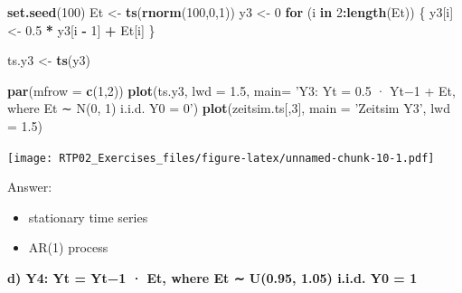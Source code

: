 \documentclass[
]{article}
\newenvironment{Shaded}{\begin{snugshade}}{\end{snugshade}}
\newcommand{\ControlFlowTok}[1]{\textcolor[rgb]{0.13,0.29,0.53}{\textbf{#1}}}
\newcommand{\DataTypeTok}[1]{\textcolor[rgb]{0.13,0.29,0.53}{#1}}
\newcommand{\DecValTok}[1]{\textcolor[rgb]{0.00,0.00,0.81}{#1}}
\newcommand{\FloatTok}[1]{\textcolor[rgb]{0.00,0.00,0.81}{#1}}
\newcommand{\KeywordTok}[1]{\textcolor[rgb]{0.13,0.29,0.53}{\textbf{#1}}}
\newcommand{\NormalTok}[1]{#1}
\newcommand{\OperatorTok}[1]{\textcolor[rgb]{0.81,0.36,0.00}{\textbf{#1}}}
\newcommand{\StringTok}[1]{\textcolor[rgb]{0.31,0.60,0.02}{#1}}
\begin{document}
\begin{Shaded}
\begin{Highlighting}[]
\KeywordTok{set.seed}\NormalTok{(}\DecValTok{100}\NormalTok{)}
\NormalTok{Et <-}\StringTok{ }\KeywordTok{ts}\NormalTok{(}\KeywordTok{rnorm}\NormalTok{(}\DecValTok{100}\NormalTok{,}\DecValTok{0}\NormalTok{,}\DecValTok{1}\NormalTok{))}
\NormalTok{y3 <-}\StringTok{ }\DecValTok{0}
\ControlFlowTok{for}\NormalTok{ (i }\ControlFlowTok{in} \DecValTok{2}\OperatorTok{:}\KeywordTok{length}\NormalTok{(Et)) \{}
\NormalTok{  y3[i] <-}\StringTok{ }\FloatTok{0.5} \OperatorTok{*}\StringTok{ }\NormalTok{y3[i }\OperatorTok{-}\StringTok{ }\DecValTok{1}\NormalTok{] }\OperatorTok{+}\StringTok{ }\NormalTok{Et[i]}
\NormalTok{\}}

\NormalTok{ts.y3 <-}\StringTok{ }\KeywordTok{ts}\NormalTok{(y3)}

\KeywordTok{par}\NormalTok{(}\DataTypeTok{mfrow =} \KeywordTok{c}\NormalTok{(}\DecValTok{1}\NormalTok{,}\DecValTok{2}\NormalTok{))}
\KeywordTok{plot}\NormalTok{(ts.y3, }\DataTypeTok{lwd =} \FloatTok{1.5}\NormalTok{, }\DataTypeTok{main=} \StringTok{'Y3: Yt = 0.5 · Yt−1 + Et, where Et ∼ N(0, 1) i.i.d. Y0 = 0'}\NormalTok{)}
\KeywordTok{plot}\NormalTok{(zeitsim.ts[,}\DecValTok{3}\NormalTok{], }\DataTypeTok{main =} \StringTok{'Zeitsim Y3'}\NormalTok{, }\DataTypeTok{lwd =} \FloatTok{1.5}\NormalTok{)}
\end{Highlighting}
\end{Shaded}

\texttt{[image: RTP02\_Exercises\_files/figure-latex/unnamed-chunk-10-1.pdf]}

Answer:

\begin{itemize}
\item
  stationary time series
\item
  AR(1) process
\end{itemize}

\textbf{d) Y4: Yt = Yt−1 · Et, where Et ∼ U(0.95, 1.05) i.i.d. Y0 = 1}
\end{document}
